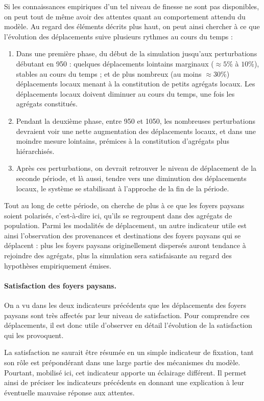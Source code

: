 Si les connaissances empiriques d'un tel niveau de finesse ne sont pas disponibles, on peut tout de même avoir des attentes quant au comportement attendu du modèle.
Au regard des éléments décrits plus haut, on peut ainsi chercher à ce que l'évolution des déplacements suive plusieurs rythmes au cours du temps :
\begin{enumerate}
\item Dans une première phase, du début de la simulation jusqu'aux perturbations débutant en 950 :
quelques déplacements lointains marginaux ($\approx 5$\% à $10$\%), stables au cours du temps ; et de plus nombreux (au moins $\approx 30$\%) déplacements locaux menant à la constitution de petits agrégats locaux.
Les déplacements locaux doivent diminuer au cours du temps, une fois les agrégats constitués.
\item Pendant la deuxième phase, entre 950 et 1050, les nombreuses perturbations devraient voir une nette augmentation des déplacements locaux, et dans une moindre mesure lointains, prémices à la constitution d'agrégats plus hiérarchisés.
\item Après ces perturbations, on devrait retrouver le niveau de déplacement de la seconde période, et là aussi, tendre vers une diminution des déplacements locaux, le système se stabilisant à l'approche de la fin de la période.
\end{enumerate}

Tout au long de cette période, on cherche de plus à ce que les foyers paysans soient polarisés, c'est-à-dire ici, qu'ils se regroupent dans des agrégats de population.
Parmi les modalités de déplacement, un autre indicateur utile est ainsi l'observation des provenances et destinations des foyers paysans qui se déplacent :
plus les foyers paysans originellement dispersés auront tendance à rejoindre des agrégats, plus la simulation sera satisfaisante au regard des hypothèses empiriquement émises.

\paragraph{Satisfaction des foyers paysans.}

On a vu dans les deux indicateurs précédents que les déplacements des foyers paysans sont très affectés par leur niveau de satisfaction.
Pour comprendre ces déplacements, il est donc utile d'observer en détail l'évolution de la satisfaction qui les provoquent.

La satisfaction ne saurait être résumée en un simple indicateur de fixation, tant son rôle est prépondérant dans une large partie des mécanismes du modèle.
Pourtant, mobilisé ici, cet indicateur apporte un éclairage différent.
Il permet ainsi de préciser les indicateurs précédents en donnant une explication à leur éventuelle mauvaise réponse aux attentes.

